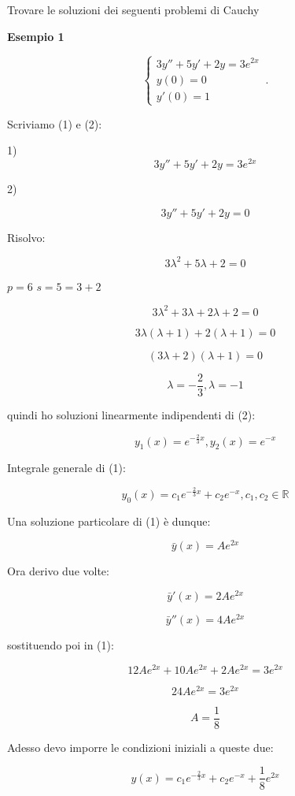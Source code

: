 \documentclass[11pt]{article}
\begin{document}
Trovare le soluzioni dei seguenti problemi di Cauchy

\textbf{Esempio 1} 

    \begin{equation}
        \begin{cases}
            3y'' + 5y' + 2y=3e ^{2x}\\
            y(0) = 0\\
            y'(0) = 1
        \end{cases}\,.
    \end{equation}

Scriviamo (1) e (2):

1)
\[
    3y''+5y'+2y = 3 e^{2x}
\]

2)

\[
    3y''+5y'+2y = 0
\]

Risolvo:

\[
    3 \lambda ^{2} + 5 \lambda + 2 = 0
\]

$p = 6$ $s=5= 3+2$ 

\[
    3 \lambda^{2} + 3 \lambda + 2 \lambda + 2 =0
\]

\[
    3 \lambda ( \lambda+1) + 2( \lambda + 1) =0
\]

\[
    (3 \lambda +2 ) ( \lambda +1 ) =0
\]

\[
    \lambda= -\frac{2}{3}, \lambda=-1
\]

quindi ho soluzioni linearmente indipendenti di (2):

\[
    y_1(x) = e ^{-\frac{2}{3}x}, y_2(x) = e ^{-x}
\]

Integrale generale di (1):

\[
    y_0(x) = c_1 e^{-\frac{2}{3}x} + c_2 e ^{-x},c_1,c_2 \in \mathbb{R}
\]


Una soluzione particolare di (1) è dunque:

\[
    \bar{y} (x) = A e ^{2x}
\]

Ora derivo due volte:

\[
    \bar{y} '(x) = 2A e ^{2x}
\]

\[
    \bar{y} ''(x) = 4A e ^{2x}
\]

sostituendo poi in (1):

\[
    12Ae ^{2x} + 10 A e ^{2x} + 2 A e ^{2x} = 3 e^{2x}
\]

\[
    24A e ^{2x} = 3 e ^{2x}
\]

\[
    A = \frac{1}{8}
\]

Adesso devo imporre le condizioni iniziali a queste due:

\[
    y(x) = c_1 e ^{-\frac{2}{3}x} + c_2 e ^{-x}+ \frac{1}{8}e ^{2x}
\]
\end{document}
